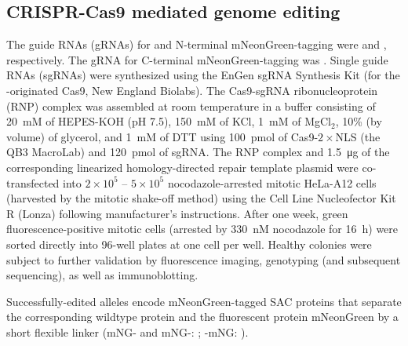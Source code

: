 \subsection{CRISPR-Cas9 mediated genome editing}
\label{CRISPRMethods}
The guide RNAs (gRNAs) for   and  N-terminal mNeonGreen-tagging were  and ,
respectively. The gRNA for   C-terminal mNeonGreen-tagging was . Single guide RNAs (sgRNAs) were synthesized using the EnGen sgRNA Synthesis Kit (for the -originated Cas9, New England Biolabs). The Cas9-sgRNA ribonucleoprotein (RNP) complex was assembled at room temperature in a buffer consisting of \SI{20}{mM} of HEPES-KOH (pH 7.5), \SI{150}{mM} of KCl, \SI{1}{mM} of MgCl$_2$, 10\% (by volume) of glycerol, and \SI{1}{mM} of DTT using \SI{100}{pmol} of Cas9-$2\times$NLS (the QB3 MacroLab) and \SI{120}{pmol} of sgRNA. The RNP complex and \SI{1.5}{\micro g} of the corresponding linearized homology-directed repair template plasmid were co-transfected into $2\times 10^5$ -- $5\times 10^5$ nocodazole-arrested mitotic HeLa-A12 cells \cite{CRISPRProtocol} (harvested by the mitotic shake-off method) using the Cell Line Nucleofector\texttrademark{} Kit R (Lonza) following manufacturer's instructions. After one week, green fluorescence-positive mitotic cells (arrested by \SI{330}{nM} nocodazole for \SI{16}{h}) were sorted directly into 96-well plates at one cell per well. Healthy colonies were subject to further validation by fluorescence imaging, genotyping (and subsequent sequencing), as well as immunoblotting.

Successfully-edited alleles encode mNeonGreen-tagged SAC proteins that separate the corresponding wildtype protein and the fluorescent protein mNeonGreen by a short flexible linker (mNG- and mNG-: ; -mNG: ).%

